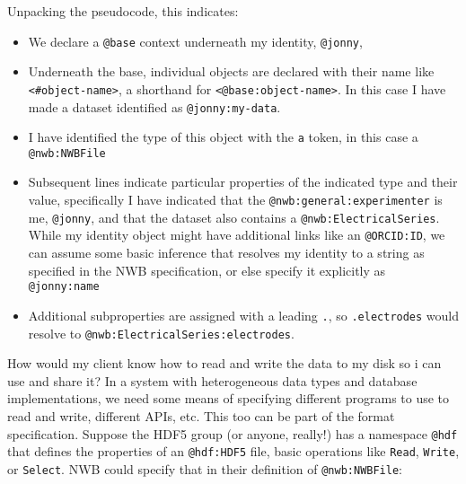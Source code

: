 \begin{Shaded}
\begin{Highlighting}[]

\end{Highlighting}
\end{Shaded}

Unpacking the pseudocode, this indicates:

\begin{itemize}
\tightlist
\item
  We declare a \texttt{@base} context underneath my identity,
  \texttt{@jonny},
\item
  Underneath the base, individual objects are declared with their name
  like \texttt{\textless{}\#object-name\textgreater{}}, a shorthand for
  \texttt{\textless{}@base:object-name\textgreater{}}. In this case I
  have made a dataset identified as \texttt{@jonny:my-data}.
\item
  I have identified the type of this object with the \texttt{a} token,
  in this case a \texttt{@nwb:NWBFile}
\item
  Subsequent lines indicate particular properties of the indicated type
  and their value, specifically I have indicated that the
  \texttt{@nwb:general:experimenter} is me, \texttt{@jonny}, and that
  the dataset also contains a \texttt{@nwb:ElectricalSeries}. While my
  identity object might have additional links like an
  \texttt{@ORCID:ID}, we can assume some basic inference that resolves
  my identity to a string as specified in the NWB specification, or else
  specify it explicitly as \texttt{@jonny:name}
\item
  Additional subproperties are assigned with a leading \texttt{.}, so
  \texttt{.electrodes} would resolve to
  \texttt{@nwb:ElectricalSeries:electrodes}.
\end{itemize}

How would my client know how to read and write the data to my disk so i
can use and share it? In a system with heterogeneous data types and
database implementations, we need some means of specifying different
programs to use to read and write, different APIs, etc. This too can be
part of the format specification. Suppose the HDF5 group (or anyone,
really!) has a namespace \texttt{@hdf} that defines the properties of an
\texttt{@hdf:HDF5} file, basic operations like \texttt{Read},
\texttt{Write}, or \texttt{Select}. NWB could specify that in their
definition of \texttt{@nwb:NWBFile}:

